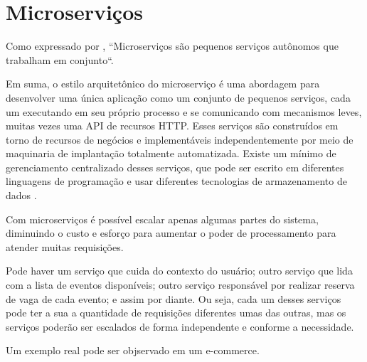 \chapter{Microserviços}

Como expressado por
\cite{building-microservices}, ``Microserviços são pequenos serviços
autônomos que trabalham em conjunto``.

\begin{citacao}
Em suma, o estilo arquitetônico do microserviço é uma abordagem para desenvolver
uma única aplicação como um conjunto de pequenos serviços, cada um executando em seu próprio processo e se comunicando
com mecanismos leves, muitas vezes uma API de recursos HTTP. Esses serviços são construídos em torno de recursos de
negócios e implementáveis independentemente por meio de maquinaria de implantação totalmente automatizada.
Existe um mínimo de gerenciamento centralizado desses serviços, que pode ser escrito em diferentes linguagens de
programação e usar diferentes tecnologias de armazenamento de dados \cite{martin-fowler-microservices}.
\end{citacao}

Com microserviços é possível escalar apenas algumas partes do sistema, diminuindo
o custo e esforço para aumentar o poder de processamento para atender muitas requisições.

Pode haver um serviço que cuida do contexto do usuário; outro serviço que lida com a
lista de eventos disponíveis; outro serviço responsável por realizar reserva de vaga de
cada evento; e assim por diante. Ou seja, cada um desses serviços pode ter a sua a quantidade
de requisições diferentes umas das outras, mas os serviços poderão ser escalados de forma
independente e conforme a necessidade.

Um exemplo real pode ser objservado em um e-commerce.

